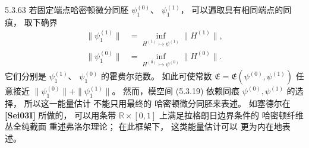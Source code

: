 \begin{remark}{5.3.63}\label{rem:5-3-63}
若固定端点哈密顿微分同胚
$\psi_1^{(0)}$、
$\psi_1^{(1)}$，
可以遍取具有相同端点的同痕，
取下确界
\[
\begin{aligned}
\|\psi_1^{(1)}\|
&=
\inf_{H^{(1)}\mapsto\psi^{(1)}}
\|H^{(1)}\|,
\\
\|\psi_1^{(0)}\|
&=
\inf_{H^{(0)}\mapsto\psi^{(0)}}
\|H^{(0)}\|.
\end{aligned}
\]
它们分别是
$\psi_1^{(1)}$、
$\psi_1^{(0)}$ 的霍费尔范数。
如此可使常数
$\mathfrak E
=\mathfrak E(\psi^{(0)},\psi^{(1)})$
任意接近
$\|\psi_1^{(0)}\|
+\|\psi_1^{(1)}\|$。
然而，模空间 (5.3.19)
依赖同痕
$\psi^{(0)},\psi^{(1)}$
的选择，
所以这一能量估计
不能只用最终的
哈密顿微分同胚来表述。
如塞德尔在 \textbf{[Sei03I]}
所做的，
可以用条带
$\mathbb R\times[0,1]$
上满足拉格朗日边界条件的
哈密顿纤维丛全纯截面
重述弗洛尔理论；
在此框架下，
这类能量估计可以
更为内在地表述。
\end{remark}
